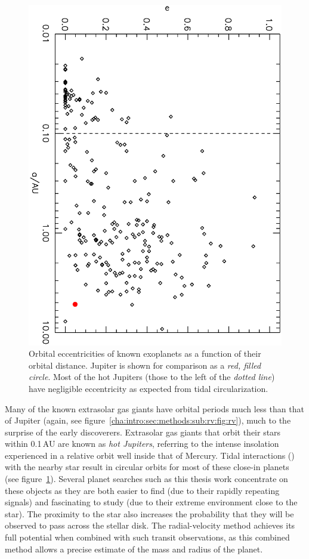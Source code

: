 \begin{figure}
\begin{center}
\centering
\includegraphics[angle=90,width=.90\textwidth]{1_rvplanetseccs}
\caption[Orbital eccentricity distribution of known exoplanets]{%
Orbital eccentricities of known exoplanets as a function of their orbital distance.
Jupiter is shown for comparison as a {\it red, filled circle}.
Most of the hot Jupiters (those to the left of the {\it dotted line}) have negligible eccentricity as expected from tidal circularization.%
}
\label{cha:intro:sec:methods:sub:rv:fig:rve}
\end{center}
\end{figure}

Many of the known extrasolar gas giants have orbital periods much less than that of Jupiter (again, see figure~\ref{cha:intro:sec:methods:sub:rv:fig:rv}), much to the surprise of the early discoverers.
Extrasolar gas giants that orbit their stars within 0.1\,AU are known as {\it hot Jupiters}, referring to the intense insolation experienced in a relative orbit well inside that of Mercury.
Tidal interactions (\citealp[see, e.g.,][]{Rasio_Ford:Science:1996a}) with the nearby star result in circular orbits for most of these close-in planets (see figure~\ref{cha:intro:sec:methods:sub:rv:fig:rve}).
Several planet searches such as this thesis work concentrate on these objects as they are both easier to find (due to their rapidly repeating signals) and fascinating to study (due to their extreme environment close to the star).
The proximity to the star also increases the probability that they will be observed to pass across the stellar disk.
The radial-velocity method achieves its full potential when combined with such transit observations, as this combined method allows a precise estimate of the mass and radius of the planet.

